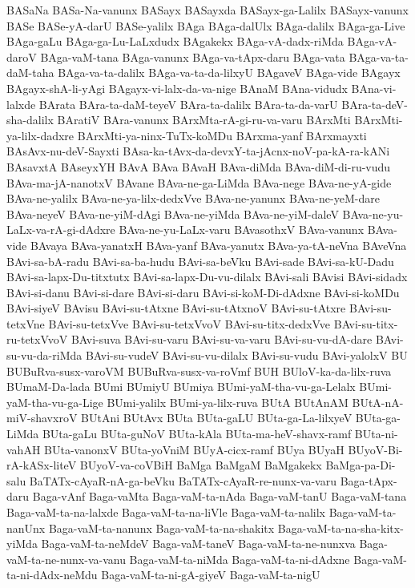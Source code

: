 {BASaNa
BASa-Na-vanunx
BASayx
BASayxda
BASayx-ga-Lalilx
BASayx-vanunx
BASe
BASe-yA-darU
BASe-yalilx
BAga
BAga-dalUlx
BAga-dalilx
BAga-ga-Live
BAga-gaLu
BAga-ga-Lu-LaLxdudx
BAgakekx
BAga-vA-dadx-riMda
BAga-vA-daroV
BAga-vaM-tana
BAga-vanunx
BAga-va-tApx-daru
BAga-vata
BAga-va-ta-daM-taha
BAga-va-ta-dalilx
BAga-va-ta-da-lilxyU
BAgaveV
BAga-vide
BAgayx
BAgayx-shA-li-yAgi
BAgayx-vi-lalx-da-va-nige
BAnaM
BAna-vidudx
BAna-vi-lalxde
BArata
BAra-ta-daM-teyeV
BAra-ta-dalilx
BAra-ta-da-varU
BAra-ta-deV-sha-dalilx
BAratiV
BAra-vanunx
BArxMta-rA-gi-ru-va-varu
BArxMti
BArxMti-ya-lilx-dadxre
BArxMti-ya-ninx-TuTx-koMDu
BArxma-yanf
BArxmayxti
BAsAvx-nu-deV-Sayxti
BAsa-ka-tAvx-da-devxY-ta-jAcnx-noV-pa-kA-ra-kANi
BAsavxtA
BAseyxYH
BAvA
BAva
BAvaH
BAva-diMda
BAva-diM-di-ru-vudu
BAva-ma-jA-nanotxV
BAvane
BAva-ne-ga-LiMda
BAva-nege
BAva-ne-yA-gide
BAva-ne-yalilx
BAva-ne-ya-lilx-dedxVve
BAva-ne-yanunx
BAva-ne-yeM-dare
BAva-neyeV
BAva-ne-yiM-dAgi
BAva-ne-yiMda
BAva-ne-yiM-daleV
BAva-ne-yu-LaLx-va-rA-gi-dAdxre
BAva-ne-yu-LaLx-varu
BAvasothxV
BAva-vanunx
BAva-vide
BAvaya
BAva-yanatxH
BAva-yanf
BAva-yanutx
BAva-ya-tA-neVna
BAveVna
BAvi-sa-bA-radu
BAvi-sa-ba-hudu
BAvi-sa-beVku
BAvi-sade
BAvi-sa-kU-Dadu
BAvi-sa-lapx-Du-titxtutx
BAvi-sa-lapx-Du-vu-dilalx
BAvi-sali
BAvisi
BAvi-sidadx
BAvi-si-danu
BAvi-si-dare
BAvi-si-daru
BAvi-si-koM-Di-dAdxne
BAvi-si-koMDu
BAvi-siyeV
BAvisu
BAvi-su-tAtxne
BAvi-su-tAtxnoV
BAvi-su-tAtxre
BAvi-su-tetxVne
BAvi-su-tetxVve
BAvi-su-tetxVvoV
BAvi-su-titx-dedxVve
BAvi-su-titx-ru-tetxVvoV
BAvi-suva
BAvi-su-varu
BAvi-su-va-varu
BAvi-su-vu-dA-dare
BAvi-su-vu-da-riMda
BAvi-su-vudeV
BAvi-su-vu-dilalx
BAvi-su-vudu
BAvi-yalolxV
BU
BUBuRva-susx-varoVM
BUBuRva-susx-va-roVmf
BUH
BUloV-ka-da-lilx-ruva
BUmaM-Da-lada
BUmi
BUmiyU
BUmiya
BUmi-yaM-tha-vu-ga-Lelalx
BUmi-yaM-tha-vu-ga-Lige
BUmi-yalilx
BUmi-ya-lilx-ruva
BUtA
BUtAnAM
BUtA-nA-miV-shavxroV
BUtAni
BUtAvx
BUta
BUta-gaLU
BUta-ga-La-lilxyeV
BUta-ga-LiMda
BUta-gaLu
BUta-guNoV
BUta-kAla
BUta-ma-heV-shavx-ramf
BUta-ni-vahAH
BUta-vanonxV
BUta-yoVniM
BUyA-cicx-ramf
BUya
BUyaH
BUyoV-Bi-rA-kASx-liteV
BUyoV-va-coVBiH
BaMga
BaMgaM
BaMgakekx
BaMga-pa-Di-salu
BaTATx-cAyaR-nA-ga-beVku
BaTATx-cAyaR-re-nunx-va-varu
Baga-tApx-daru
Baga-vAnf
Baga-vaMta
Baga-vaM-ta-nAda
Baga-vaM-tanU
Baga-vaM-tana
Baga-vaM-ta-na-lalxde
Baga-vaM-ta-na-liVle
Baga-vaM-ta-nalilx
Baga-vaM-ta-nanUnx
Baga-vaM-ta-nanunx
Baga-vaM-ta-na-shakitx
Baga-vaM-ta-na-sha-kitx-yiMda
Baga-vaM-ta-neMdeV
Baga-vaM-taneV
Baga-vaM-ta-ne-nunxva
Baga-vaM-ta-ne-nunx-va-vanu
Baga-vaM-ta-niMda
Baga-vaM-ta-ni-dAdxne
Baga-vaM-ta-ni-dAdx-neMdu
Baga-vaM-ta-ni-gA-giyeV
Baga-vaM-ta-nigU
}
